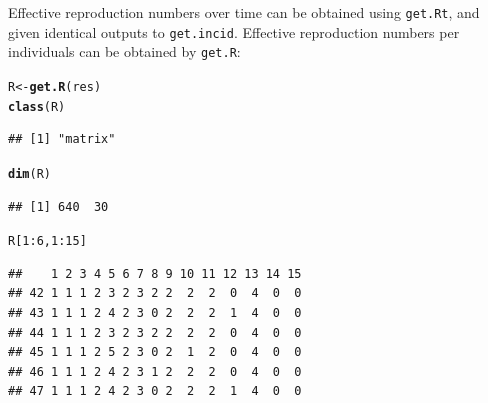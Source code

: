 \documentclass{article}\usepackage[]{graphicx}\usepackage[]{color}
\makeatletter
\newcommand{\hlnum}[1]{\textcolor[rgb]{0.686,0.059,0.569}{#1}}%
\newcommand{\hlopt}[1]{\textcolor[rgb]{0,0,0}{#1}}%
\newcommand{\hlstd}[1]{\textcolor[rgb]{0.345,0.345,0.345}{#1}}%
\newcommand{\hlkwb}[1]{\textcolor[rgb]{0.69,0.353,0.396}{#1}}%
\newcommand{\hlkwd}[1]{\textcolor[rgb]{0.737,0.353,0.396}{\textbf{#1}}}%
\newenvironment{kframe}{%
 \def\at@end@of@kframe{}%
 \ifinner\ifhmode%
  \def\at@end@of@kframe{\end{minipage}}%
  \begin{minipage}{\columnwidth}%
 \fi\fi%
 \def\FrameCommand##1{\hskip\@totalleftmargin \hskip-\fboxsep
 \colorbox{shadecolor}{##1}\hskip-\fboxsep
     \hskip-\linewidth \hskip-\@totalleftmargin \hskip\columnwidth}%
 \MakeFramed {\advance\hsize-\width
   \@totalleftmargin\z@ \linewidth\hsize
   \@setminipage}}%
 {\par\unskip\endMakeFramed%
 \at@end@of@kframe}
\newenvironment{knitrout}{}{} %
\makeatother
\begin{document}
Effective reproduction numbers over time can be obtained using \texttt{get.Rt}, and given identical outputs to \texttt{get.incid}.
Effective reproduction numbers per individuals can be obtained by \texttt{get.R}:
\begin{knitrout}
\color{fgcolor}\begin{kframe}
\begin{alltt}
\hlstd{R} \hlkwb{<-} \hlkwd{get.R}\hlstd{(res)}
\hlkwd{class}\hlstd{(R)}
\end{alltt}
\begin{verbatim}
## [1] "matrix"
\end{verbatim}
\begin{alltt}
\hlkwd{dim}\hlstd{(R)}
\end{alltt}
\begin{verbatim}
## [1] 640  30
\end{verbatim}
\begin{alltt}
\hlstd{R[}\hlnum{1}\hlopt{:}\hlnum{6}\hlstd{,}\hlnum{1}\hlopt{:}\hlnum{15}\hlstd{]}
\end{alltt}
\begin{verbatim}
##    1 2 3 4 5 6 7 8 9 10 11 12 13 14 15
## 42 1 1 1 2 3 2 3 2 2  2  2  0  4  0  0
## 43 1 1 1 2 4 2 3 0 2  2  2  1  4  0  0
## 44 1 1 1 2 3 2 3 2 2  2  2  0  4  0  0
## 45 1 1 1 2 5 2 3 0 2  1  2  0  4  0  0
## 46 1 1 1 2 4 2 3 1 2  2  2  0  4  0  0
## 47 1 1 1 2 4 2 3 0 2  2  2  1  4  0  0
\end{verbatim}
\end{kframe}
\end{knitrout}
\end{document}
